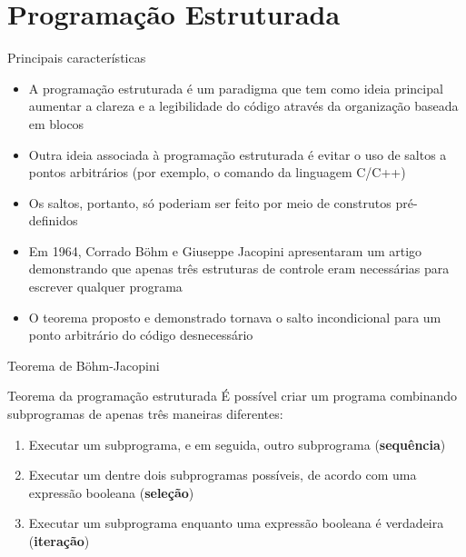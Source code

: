 \section{Programação Estruturada}

\begin{frame}[fragile]{Principais características}

    \begin{itemize}
        \item A programação estruturada é um paradigma que tem como ideia principal aumentar a 
            clareza e a legibilidade do código através da organização baseada em blocos

        \item Outra ideia associada à programação estruturada é evitar o uso de saltos 
            a pontos arbitrários (por exemplo, o comando  da linguagem C/C++)

        \item Os saltos, portanto, só poderiam ser feito por meio de construtos pré-definidos

        \item Em 1964, Corrado Böhm e Giuseppe Jacopini apresentaram um artigo demonstrando que
            apenas três estruturas de controle eram necessárias para escrever qualquer programa

        \item O teorema proposto e demonstrado tornava o salto incondicional para um ponto
            arbitrário do código desnecessário
    \end{itemize}

\end{frame}

\begin{frame}[fragile]{Teorema de Böhm-Jacopini}

    \begin{block}{Teorema da programação estruturada}
        É possível criar um programa combinando subprogramas de apenas três maneiras diferentes:
        \begin{enumerate}
            \item Executar um subprograma, e em seguida, outro subprograma (\textbf{sequência})
            \item Executar um dentre dois subprogramas possíveis, de acordo com uma expressão
                booleana (\textbf{seleção})
            \item Executar um subprograma enquanto uma expressão booleana é verdadeira 
                (\textbf{iteração})
        \end{enumerate}
    \end{block}

\end{frame}

